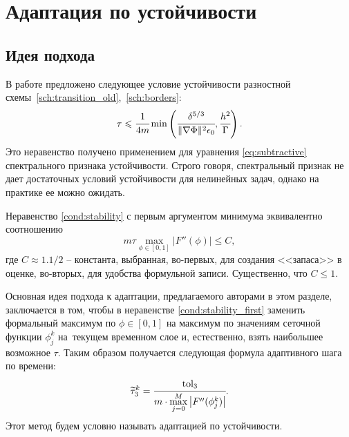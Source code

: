 
\section{Адаптация по устойчивости}

\subsection{Идея подхода}

В работе \cite{ponomarev_stability} предложено следующее условие устойчивости разностной схе\forcehyphenation мы~\eqref{sch:transition_old},~\eqref{sch:borders}:
\begin{equation}
	\tau \leqslant \cfrac{1}{4m} \min \left( \cfrac{\delta^{5/3}}{\| \nabla \Phi \|^2 \epsilon_0}, \cfrac{h^2}{\Gamma} \right).
	\label{cond:stability}
\end{equation}
Это неравенство получено применением для уравнения \eqref{eq:subtractive} спектрального признака устойчивости. Строго говоря, спектральный признак не дает достаточных условий \linebreak устойчивости для нелинейных задач, однако на практике ее можно ожидать.

Неравенство \eqref{cond:stability} с первым аргументом минимума эквивалентно соотношению
\begin{equation}
	m \tau \max\limits_{\phi \in [0, 1]} \left| F''(\phi) \right| \leqslant C,
	\label{cond:stability_first}
\end{equation}
где $C \approx 1.1 / 2$ -- константа, выбранная, во-первых, для создания <<запаса>> в оценке, во-вторых, для удобства формульной записи. Существенно, что \linebreak $C \leqslant 1$.

Основная идея подхода к адаптации, предлагаемого авторами в этом разделе, заключается в том, чтобы в неравенстве \eqref{cond:stability_first} заменить формальный максимум по $\phi \in [0, 1]$ на максимум по значениям сеточной функции $\phi_j^k$ на~текущем временном слое и, естественно, взять наибольшее возможное $\tau$. Таким образом получается следующая формула адаптивного шага по времени:
\begin{equation}
	\widetilde{\tau}_3^k = \cfrac{{\text{tol}}_3}{m \cdot \max\limits_{j = 0}^M \left| F''(\phi_j^k) \right|}.
	\label{sch:time_step_stability_raw}
\end{equation}
Этот метод будем условно называть адаптацией по устойчивости.

